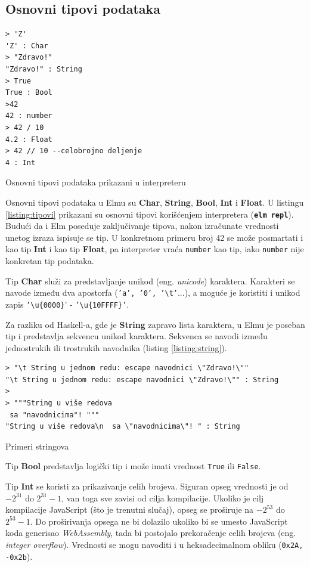 \documentclass[12pt,oneside]{memoir}
\begin{document}
\subsection{Osnovni tipovi podataka}
\begin{listing}[h]
\begin{verbatim}
> 'Z'
'Z' : Char
> "Zdravo!"
"Zdravo!" : String
> True
True : Bool
>42
42 : number
> 42 / 10 
4.2 : Float
> 42 // 10 --celobrojno deljenje
4 : Int
\end{verbatim}
\caption{Osnovni tipovi podataka prikazani u interpreteru}
\label{listing:tipovi}
\end{listing}
Osnovni tipovi podataka u Elmu su \textbf{Char}, \textbf{String}, \textbf{Bool},
\textbf{Int} i \textbf{Float}. U listingu \ref{listing:tipovi} prikazani su osnovni
tipovi korišćenjem interpretera (\texttt{\textbf{elm repl}}). Budući da i Elm poseduje zaključivanje tipova, nakon
izračunate vrednosti unetog izraza ispisuje se tip. U konkretnom primeru broj 42 se
može posmartati i kao tip \textbf{Int} i kao tip \textbf{Float}, pa interpreter vraća
\texttt{number} kao tip, iako \texttt{number} nije konkretan tip podataka.


Tip \textbf{Char} služi za predstavljanje unikod (eng. \emph{unicode}) karaktera.
Karakteri se navode između dva apostorfa (\texttt{'a', '0', '\textbackslash t'}...), a
moguće je koristiti i unikod zapis  \texttt{'\textbackslash u\{0000\}}' -
\texttt{'\textbackslash u\{10FFFF\}'}.

Za razliku od Haskell-a, gde je \textbf{String} zapravo lista karaktera, u Elmu je
poseban tip i predstavlja sekvencu unikod karaktera. Sekvenca se navodi između
jednostrukih ili trostrukih navodnika (listing \ref{listing:string}).

\begin{listing}[ht]
\begin{verbatim}
> "\t String u jednom redu: escape navodnici \"Zdravo!\""
"\t String u jednom redu: escape navodnici \"Zdravo!\"" : String
>
> """String u više redova
 sa "navodnicima"! """
"String u više redova\n  sa \"navodnicima\"! " : String
\end{verbatim}
\caption{Primeri stringova}
\label{listing:string}
\end{listing}

Tip \textbf{Bool} predstavlja logički tip i može imati vrednost \texttt{True} ili
\texttt{False}. 

Tip \textbf{Int} se koristi za prikazivanje celih brojeva. Siguran opseg vrednosti je
od \(-2^{31}\) do \(2^{31} - 1\), van toga sve zavisi od cilja kompilacije. Ukoliko je
cilj kompilacije JavaScript (što je trenutni slučaj), opseg se proširuje na \(-2^{53}\) do
\(2^{53} - 1\). Do proširivanja opsega ne bi dolazilo ukoliko bi se
umesto JavaScript koda generisao \emph{WebAssembly}, tada bi postojalo prekoračenje celih
brojeva (eng. \emph{integer overflow}). Vrednosti se mogu navoditi i u heksadecimalnom
obliku (\texttt{0x2A, -0x2b}).
\end{document}
